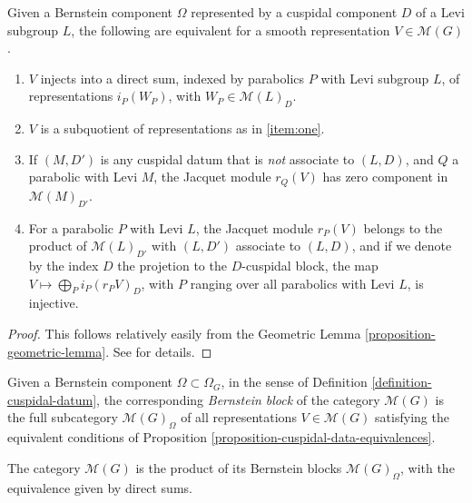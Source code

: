 \begin{proposition}
	\label{proposition-cuspidal-data-equivalences}
Given a Bernstein component $\Omega$ represented by a cuspidal component $D$ of a Levi subgroup $L$, the following are equivalent for a smooth representation $V\in \mathcal M(G)$.
\begin{enumerate}
	\item \label{item:one} $V$ injects into a direct sum, indexed by parabolics $P$ with Levi subgroup $L$, of representations $i_P(W_P)$, with $W_P\in \mathcal M(L)_D$.
	\item $V$ is a subquotient of representations as in \eqref{item:one}.
	\item If $(M,D')$ is any cuspidal datum that is \emph{not} associate to $(L,D)$, and $Q$ a parabolic with Levi $M$, the Jacquet module $r_Q(V)$ has zero component in $\mathcal M(M)_{D'}$.
	\item For a parabolic $P$ with Levi $L$, the Jacquet module $r_P(V)$ belongs to the product of $\mathcal M(L)_{D'}$ with $(L,D')$ associate to $(L,D)$, and if we denote by the index $D$ the projetion to the $D$-cuspidal block, the map $V\mapsto \bigoplus_P i_P(r_P V)_D$, with $P$ ranging over all parabolics with Levi $L$, is injective.
\end{enumerate}
\end{proposition}

\begin{proof}
This follows relatively easily from the Geometric Lemma \ref{proposition-geometric-lemma}. See \cite[Proposition-definition 2.8]{Bernstein-centre} for details.
\end{proof}





\begin{definition}
	\label{definition-Bernstein-block}
Given a Bernstein component $\Omega\subset \Omega_G$, in the sense of Definition \ref{definition-cuspidal-datum}, the corresponding {\it Bernstein block} of the category $\mathcal M(G)$ is the full subcategory $\mathcal M(G)_\Omega$ of all representations $V\in \mathcal M(G)$ satisfying the equivalent conditions of Proposition \ref{proposition-cuspidal-data-equivalences}. 
\end{definition}



\begin{theorem}
	\label{theorem-Bernstein-decomposition}
The category $\mathcal M(G)$ is the product of its Bernstein blocks $\mathcal M(G)_\Omega$, with the equivalence given by direct sums.
\end{theorem}

